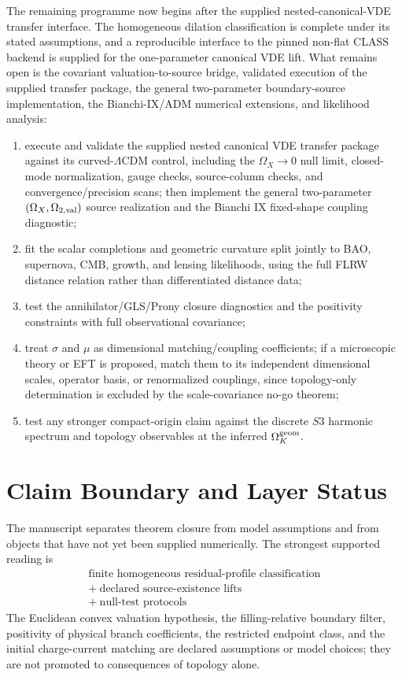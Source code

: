 \documentclass[11pt,a4paper]{article}
\def\Sthree{S3}%
\numberwithin{equation}{section}
\theoremstyle{definition}
\theoremstyle{plain}
\theoremstyle{remark}
\newcommand{\Sthree}{S^3}
\begin{document}
The remaining programme now begins after the supplied nested-canonical-VDE
transfer interface.  The homogeneous dilation classification is complete under
its stated assumptions, and a reproducible interface to the pinned non-flat
CLASS backend is supplied for the one-parameter canonical VDE lift.  What
remains open is the covariant valuation-to-source bridge, validated execution
of the supplied transfer package, the general two-parameter boundary-source
implementation, the Bianchi-IX/ADM numerical extensions, and likelihood
analysis:
\begin{enumerate}
\item execute and validate the supplied nested canonical VDE transfer package against its curved-\(\Lambda\)CDM control, including the \(\Omega_X\to0\) null limit, closed-mode normalization, gauge checks, source-column checks, and convergence/precision scans; then implement the general two-parameter \((\Omega_X,\Omega_{2,\rm val})\) source realization and the Bianchi IX fixed-shape coupling diagnostic;
\item fit the scalar completions and geometric curvature split jointly to BAO, supernova, CMB, growth, and lensing likelihoods, using the full FLRW distance relation rather than differentiated distance data;
\item test the annihilator/GLS/Prony closure diagnostics and the positivity constraints with full observational covariance;
\item treat \(\sigma\) and \(\mu\) as dimensional matching/coupling coefficients; if a microscopic theory or EFT is proposed, match them to its independent dimensional scales, operator basis, or renormalized couplings, since topology-only determination is excluded by the scale-covariance no-go theorem;
\item test any stronger compact-origin claim against the discrete \(\Sthree\) harmonic spectrum and topology observables at the inferred \(\Omega_K^{\rm geom}\).
\end{enumerate}

\section{Claim Boundary and Layer Status}
\label{sec:claim-boundary-status}

The manuscript separates theorem closure from model assumptions and from objects
that have not yet been supplied numerically.  The strongest supported reading is
\begin{equation}
\boxed{
\begin{gathered}
\text{finite homogeneous residual-profile classification}\\
+\ \text{declared source-existence lifts}\\
+\ \text{null-test protocols}
\end{gathered}}
\end{equation}
The Euclidean convex valuation hypothesis, the filling-relative boundary filter,
positivity of physical branch coefficients, the restricted endpoint class, and
the initial charge-current matching are declared assumptions or model choices;
they are not promoted to consequences of topology alone.
\end{document}
